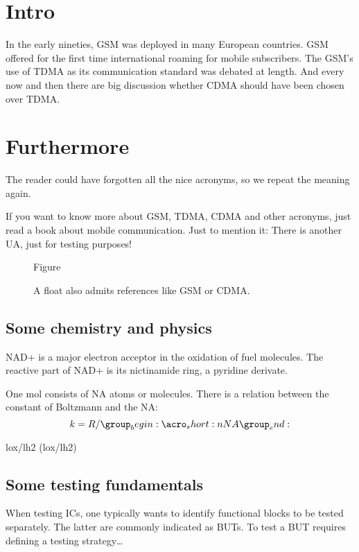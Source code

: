 \documentclass{article}
\begin{document}
\section{Intro}
In the early nineties, \acs{GSM} was deployed in many European
countries. \ac{GSM} offered for the first time international
roaming for mobile subscribers. The \acs{GSM}'s use of \ac{TDMA} as
its communication standard was debated at length. And every now
and then there are big discussion whether \ac{CDMA} should have
been chosen over \ac{TDMA}.

\section{Furthermore}
\acreset
The reader could have forgotten all the nice acronyms, so we repeat the
meaning again.

If you want to know more about \acf{GSM}, \acf{TDMA}, \acf{CDMA}
and other acronyms, just read a book about mobile communication. Just
to mention it: There is another \ac{UA}, just for testing purposes!

\begin{figure}[h]
Figure
\caption{A float also admits references like \ac{GSM} or \acf{CDMA}.}
\end{figure}

\subsection{Some chemistry and physics}
\label{Chem}
\ac{NAD+} is a major electron acceptor in the oxidation
of fuel molecules. The reactive part of \ac{NAD+} is its nictinamide
ring, a pyridine derivate.

One mol consists of \acs{NA} atoms or molecules. There is a relation
between the constant of Boltzmann and the \acl{NA}:
\begin{equation}
  k = R/\acs{NA}
\end{equation}

\acl{lox}/\acl{lh2} (\acs{lox}/\acs{lh2})

\subsection{Some testing fundamentals}
When testing \acp{IC}, one typically wants to identify functional
blocks to be tested separately. The latter are commonly indicated as
\acp{BUT}. To test a \ac{BUT} requires defining a testing strategy\dots

\printacronyms
\end{document}
